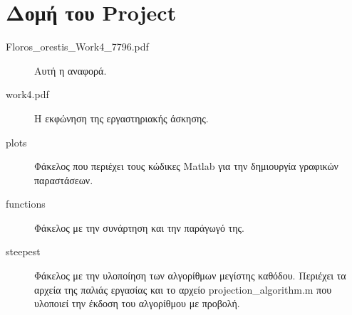 \chapter*{Δομή του Project} \label{project-structure}

\begin{description}
	\item[Floros\_orestis\_Work4\_7796.pdf] Αυτή η αναφορά.
	\item[work4.pdf] Η εκφώνηση της εργαστηριακής άσκησης.
	\item[plots] Φάκελος που περιέχει τους κώδικες Matlab για την δημιουργία γραφικών παραστάσεων.
	\item[functions] Φάκελος με την συνάρτηση και την παράγωγό της.
	\item[steepest] Φάκελος με την υλοποίηση των αλγορίθμων μεγίστης καθόδου. Περιέχει τα αρχεία της παλιάς εργασίας και το αρχείο projection\_algorithm.m που υλοποιεί την έκδοση του αλγορίθμου με προβολή.
\end{description}










